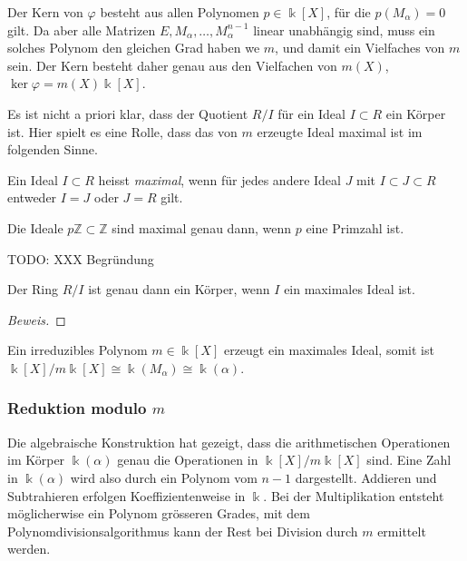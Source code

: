 Der Kern von $\varphi$ besteht aus allen Polynomen $p\in\Bbbk[X]$,
für die $p(M_\alpha)=0$ gilt.
Da aber alle Matrizen $E,M_\alpha,\dots,M_\alpha^{n-1}$ linear
unabhängig sind, muss ein solches Polynom den gleichen Grad haben
we $m$, und damit ein Vielfaches von $m$ sein.
Der Kern besteht daher genau aus den Vielfachen von $m(X)$,
$\ker\varphi = m(X)\Bbbk[X]$.

Es ist nicht a priori klar, dass der Quotient $R/I$ für ein
Ideal $I\subset R$ ein Körper ist.
Hier spielt es eine Rolle, dass das von $m$ erzeugte Ideal
maximal ist im folgenden Sinne.

\begin{definition}
Ein Ideal $I\subset R$ heisst {\em maximal}, wenn für jedes andere Ideal
$J$ mit $I\subset J\subset R$ entweder $I=J$ oder $J=R$ gilt.
\end{definition}

\begin{beispiel}
Die Ideale $p\mathbb{Z}\subset \mathbb{Z}$ sind maximal genau dann, wenn
$p$ eine Primzahl ist.

TODO: XXX Begründung
\end{beispiel}

\begin{satz}
Der Ring $R/I$ ist genau dann ein Körper, wenn $I$ ein maximales Ideal ist.
\end{satz}

\begin{proof}[Beweis]
\end{proof}

Ein irreduzibles Polynom $m\in\Bbbk[X]$ erzeugt ein maximales Ideal,
somit ist $\Bbbk[X]/m\Bbbk[X]\cong \Bbbk(M_\alpha) \cong \Bbbk(\alpha)$.

\subsubsection{Reduktion modulo $m$}
Die algebraische Konstruktion hat gezeigt, dass die arithmetischen
Operationen im Körper $\Bbbk(\alpha)$ genau die Operationen 
in $\Bbbk[X]/m\Bbbk[X]$ sind.
Eine Zahl in $\Bbbk(\alpha)$ wird also durch ein Polynom vom 
$n-1$ dargestellt.
Addieren und Subtrahieren erfolgen Koeffizientenweise in $\Bbbk$.
Bei der Multiplikation entsteht möglicherwise ein Polynom grösseren
Grades, mit dem Polynomdivisionsalgorithmus kann der Rest bei Division
durch $m$ ermittelt werden.

